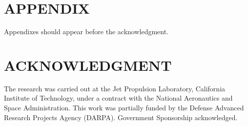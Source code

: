 \documentclass[a4paper, 10pt, conference]{ieeeconf}      %
\begin{document}



\section*{APPENDIX}

Appendixes should appear before the acknowledgment.

\section*{ACKNOWLEDGMENT}
The research was carried out at the Jet Propulsion Laboratory, California Institute of Technology, under a contract with the National Aeronautics and Space Administration. This work was partially funded by the Defense Advanced Research Projects Agency (DARPA). Government Sponsorship acknowledged.







\end{document}
